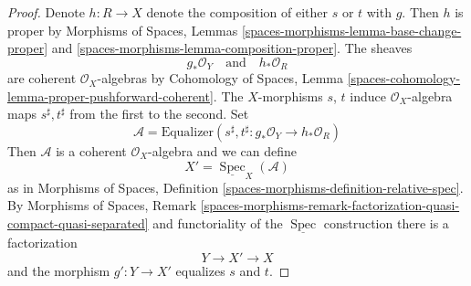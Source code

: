 \documentclass{stacks-project}
\theoremstyle{plain}
\theoremstyle{definition}
\theoremstyle{remark}
\numberwithin{equation}{subsection}
\def\Spec{\mathop{\mathrm{Spec}}}
\begin{document}
\begin{proof}
Denote $h : R \to X$ denote the composition of either $s$ or $t$
with $g$. Then $h$ is proper by Morphisms of Spaces, Lemmas
\ref{spaces-morphisms-lemma-base-change-proper} and
\ref{spaces-morphisms-lemma-composition-proper}.
The sheaves
$$
g_*\mathcal{O}_Y
\quad\text{and}\quad
h_*\mathcal{O}_R
$$
are coherent $\mathcal{O}_X$-algebras by Cohomology of Spaces, Lemma
\ref{spaces-cohomology-lemma-proper-pushforward-coherent}.
The $X$-morphisms $s$, $t$ induce $\mathcal{O}_X$-algebra maps
$s^\sharp, t^\sharp$ from the first to the second.
Set
$$
\mathcal{A} = \text{Equalizer}\left(s^\sharp, t^\sharp :
g_*\mathcal{O}_Y \longrightarrow h_*\mathcal{O}_R\right)
$$
Then $\mathcal{A}$ is a coherent $\mathcal{O}_X$-algebra and we
can define
$$
X' = \underline{\Spec}_X(\mathcal{A})
$$
as in Morphisms of Spaces, Definition
\ref{spaces-morphisms-definition-relative-spec}.
By Morphisms of Spaces, Remark
\ref{spaces-morphisms-remark-factorization-quasi-compact-quasi-separated}
and functoriality of the $\underline{\Spec}$ construction
there is a factorization
$$
Y \longrightarrow X' \longrightarrow X
$$
and the morphism $g' : Y \to X'$ equalizes $s$ and $t$.


\end{proof}
\end{document}
